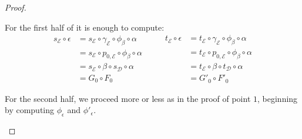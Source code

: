 \documentclass[a4paper,UKenglish,cleveref,pdftex,thm-restate,numberwithinsect]{lipics-v2021}
\begin{document}
\begin{proof}
\begin{enumerate}
		For the first half of  it is enough to compute:
			\[\begin{split}
				s_{\mathcal{E}}\circ \epsilon &= s_{\mathcal{E}}\circ \gamma_{\mathcal{E}}\circ \phi_{\beta}\circ \alpha\\&=  s_{\mathcal{E}}\circ p_{0, \mathcal{E}}\circ \phi_{\beta}\circ \alpha \\&= s_{\mathcal{E}} \circ \beta \circ s_{\mathcal{D}} \circ \alpha \\&=G_0\circ F_0 
			\end{split}\qquad \begin{split}
				t_{\mathcal{E}}\circ \epsilon &= t_{\mathcal{E}}\circ \gamma_{\mathcal{E}}\circ \phi_{\beta}\circ \alpha\\&=  t_{\mathcal{E}}\circ p_{0, \mathcal{E}}\circ \phi_{\beta}\circ \alpha \\&= t_{\mathcal{E}} \circ \beta \circ t_{\mathcal{D}} \circ \alpha \\&=G'_0\circ F'_0 
			\end{split}\]
			
			For the second half, we proceed more or less as in the proof of point $1$, beginning by computing $\phi_{\epsilon}$ and $\phi'_{\epsilon}$. 
			
			
			\iffalse  We start by noticing that:
			\begin{align*}
				t_{\mathcal{E}}\circ \beta \circ F_0&=  G'_0\circ F_0 \\&=G'_0\circ s_{\mathcal{D}}\circ \alpha \\&=s_{\mathcal{E}}\circ G'_1\circ \alpha 
			\end{align*}
			so that the diagram below commutes and the dotted arrow $\chi_{(\alpha, \beta)}\colon O_{\mathcal{C}}\to P_{\mathcal{E}}$ exists.
		
			
		We can start by buildin an arrow 
			\[\xymatrix@C=40pt{O_{\mathcal{C}} \ar[r]^{\alpha} \ar[d]_{F_{0}} \ar@{.>}[dr]_{\chi_{(\alpha, \beta)}}&A_{\mathcal{D}}\ar[dr]^{G'_1}\\O_{\mathcal{D}} \ar[dr]_{\beta} & P_{\mathcal{E}} \ar[r]^{p_{1, \mathcal{E}}} \ar[d]_{p_{0, \mathcal{E}}} & A_{\mathcal{E}}\ \ar[d]^{s_{\mathcal{E}}} \\ &A_{\mathcal{E}}\ar[r]_{t_{\mathcal{E}}} & O_{\mathcal{E}}}\]
				\fi 
				

\end{enumerate}
\end{proof}
\end{document}
